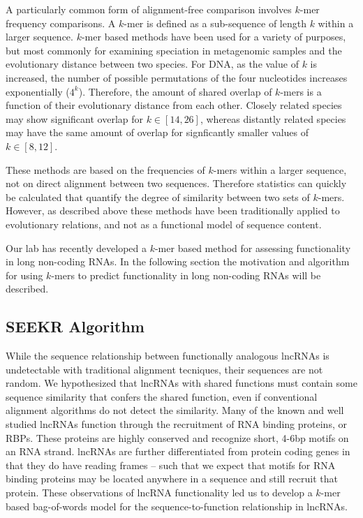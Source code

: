 A particularly common form of alignment-free comparison involves $k$-mer frequency comparisons. A $k$-mer is defined as a sub-sequence of length $k$ within a larger sequence. $k$-mer based methods have been used for a variety of purposes, but most commonly for examining speciation in metagenomic samples and the evolutionary distance between two species. For DNA, as the value of $k$ is increased, the number of possible permutations of the four nucleotides increases exponentially ($4^k$). Therefore, the amount of shared overlap of $k$-mers is a function of their evolutionary distance from each other. Closely related species may show significant overlap for $k\in[14,26]$, whereas distantly related species may have the same amount of overlap for signficantly smaller values of $k\in[8,12]$.

These methods are based on the frequencies of $k$-mers within a larger sequence, not on direct alignment between two sequences. Therefore statistics can quickly be calculated that quantify the degree of similarity between two sets of $k$-mers. However, as described above these methods have been traditionally applied to evolutionary relations, and not as a functional model of sequence content. 

Our lab has recently developed a $k$-mer based method for assessing functionality in long non-coding RNAs. In the following section the motivation and algorithm for using $k$-mers to predict functionality in long non-coding RNAs will be described. 

\subsection{SEEKR Algorithm}

 While the sequence relationship between functionally analogous lncRNAs is undetectable with traditional alignment tecniques, their sequences are not random. We hypothesized that lncRNAs with shared functions must contain some sequence similarity that confers the shared function, even if conventional alignment algorithms do not detect the similarity. Many of the known and well studied lncRNAs function through the recruitment of RNA binding proteins, or RBPs. These proteins are highly conserved and recognize short, 4-6bp motifs on an RNA strand. lncRNAs are further differentiated from protein coding genes in that they do have reading frames -- such that we expect that motifs for RNA binding proteins may be located anywhere in a sequence and still recruit that protein. These observations of lncRNA functionality led us to develop a $k$-mer based bag-of-words model for the sequence-to-function relationship in lncRNAs.
 
